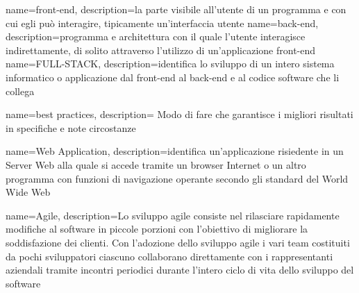 \label{glossario}

{
    name=front-end,
    description={la parte visibile all'utente di un programma e con cui egli può interagire, tipicamente un'interfaccia utente}
}
{
    name=back-end,
    description={programma e architettura con il quale l'utente interagisce indirettamente, di solito attraverso l'utilizzo di un'applicazione front-end}
}
{
    name=FULL-STACK,
    description={identifica lo sviluppo di un intero sistema informatico o applicazione dal front-end al back-end e al codice software che li collega}
}

{
    name=best practices,
    description={ Modo di fare che garantisce i migliori risultati in specifiche e note circostanze}
}


{
    name=Web Application,
    description={identifica un’applicazione  risiedente  in  un  Server  Web  alla  quale  si  accede  tramite  un  browser  Internet  o  un  altro  programma  con  funzioni  di  navigazione  operante secondo gli standard del World Wide Web}
}

{
    name=Agile,
    description={Lo sviluppo agile consiste nel rilasciare rapidamente modifiche al software in piccole porzioni con l'obiettivo di migliorare la soddisfazione dei clienti. Con l'adozione dello sviluppo agile i vari team costituiti da pochi sviluppatori ciascuno collaborano direttamente con i rappresentanti aziendali tramite incontri periodici durante l'intero ciclo di vita dello sviluppo del software}
}




